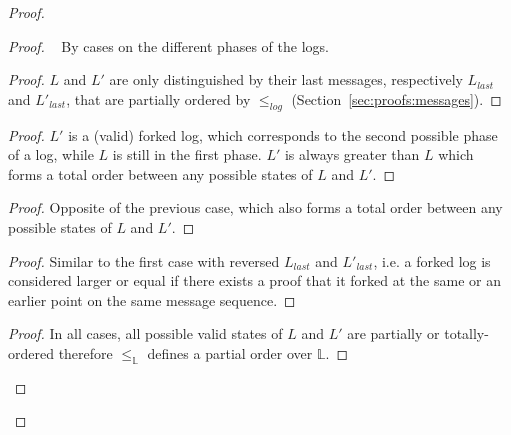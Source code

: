 \documentclass[9pt, oneside]{article}   	%
\begin{document}
\begin{proof}
		
	\begin{proof}

		\pfsketch~  By cases on the different phases of the logs.
		
		
		\begin{proof}
			$L$ and $L'$ are only distinguished by their last messages, respectively $L_\textit{last}$ and $L'_\textit{last}$, that are partially ordered by $\leq_\textit{log}$ (Section~\ref{sec:proofs:messages}). 
		\end{proof}
		
		\begin{proof}
			$L'$ is a (valid) forked log, which corresponds to the second possible phase of a log, while $L$ is still in the first phase. $L'$ is always greater than $L$ which forms a total order between any possible states of $L$ and $L'$.
		\end{proof}
		
		\begin{proof}
			Opposite of the previous case, which also forms a total order between any possible states of $L$ and $L'$.
		\end{proof}
		
		\begin{proof}
			Similar to the first case with reversed $L_\textit{last}$ and $L'_\textit{last}$, i.e. a forked log is considered larger or equal if there exists a proof that it forked at the same or an earlier point on the same message sequence. 
		\end{proof}
		
		\qedstep{}
		\begin{proof}
			In all cases, all possible valid states of $L$ and $L'$ are partially or totally-ordered therefore $\leq_\mathds{L}$ defines a partial order over  $\mathds{L}$.
		\end{proof}
	\end{proof}
	

\end{proof}
\end{document}
